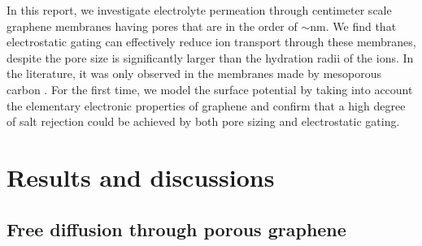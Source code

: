 \documentclass[journal=nalefd,email=true, hyperref=true, keywords=false]{achemso}
\renewcommand*{\textcolor}[2]{#2}
\begin{document}

\textcolor{blue}{ In this report, we investigate electrolyte
  permeation through centimeter scale graphene membranes having pores
  that are in the order of $\sim{}$\unit[20]{nm}. We find that
  electrostatic gating can effectively reduce ion transport through
  these membranes, despite the pore size is significantly larger than
  the hydration radii of the ions. In the literature, it was only
  observed in the membranes made by mesoporous carbon
  \cite{Surwade_2014}. For the first time, we model the surface
  potential by taking into account the elementary electronic
  properties of graphene and confirm that a high degree of salt
  rejection could be achieved by both pore sizing and electrostatic
  gating. }

\section{Results and discussions}
\label{sec:res}

\subsection{Free diffusion through porous graphene}
\label{sec:res-1}
\end{document}
